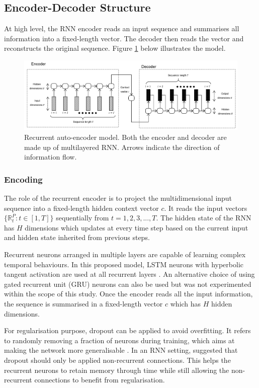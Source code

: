 \documentclass[runningheads]{llncs}
\begin{document}
\subsection{Encoder-Decoder Structure} 
At high level, the RNN encoder reads an input sequence and summarises all information into a fixed-length vector. The decoder then reads the vector and reconstructs the original sequence. Figure \ref{fig:seq2seq} below illustrates the model.

\begin{figure}[H]
	\centering
	\includegraphics[width=1\textwidth]{seq2seq.PNG}
	\caption{Recurrent auto-encoder model. Both the encoder and decoder are made up of multilayered RNN. Arrows indicate the direction of information flow.}
	\label{fig:seq2seq}
\end{figure}

\subsubsection{Encoding}

The role of the recurrent encoder is to project the multidimensional input sequence into a fixed-length hidden context vector \(c\). It reads the input vectors \(\{\mathbb{R}_t^P:t\in [1,T]\}\) sequentially from \(t=1,2,3,...,T\). The hidden state of the RNN has \(H\) dimensions which updates at every time step based on the current input and hidden state inherited from previous steps.

Recurrent neurons arranged in multiple layers are capable of learning complex temporal behaviours. In this proposed model, LSTM neurons with hyperbolic tangent activation are used at all recurrent layers \cite{hochreiter1997}. An alternative choice of using gated recurrent unit (GRU) neurons \cite{cho2014} can also be used but was not experimented within the scope of this study. Once the encoder reads all the input information, the sequence is summarised in a fixed-length vector \(c\) which has \(H\) hidden dimensions.

For regularisation purpose, dropout can be applied to avoid overfitting. It refers to randomly removing a fraction of neurons during training, which aims at making the network more generalisable \cite{srivastava2014}. In an RNN setting, \cite{zaremba2014} suggested that dropout should only be applied non-recurrent connections. This helps the recurrent neurons to retain memory through time while still allowing the non-recurrent connections to benefit from regularisation.
\end{document}
